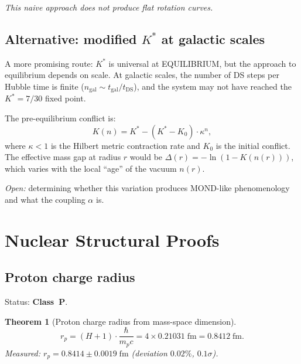 \documentclass[11pt,a4paper]{article}
\newtheorem{theorem}{Theorem}[section]
\theoremstyle{definition}
\theoremstyle{remark}
\begin{document}
\emph{This naive approach does not produce flat rotation curves.}

\subsection{Alternative: modified $K^*$ at galactic scales}\label{sec:modified_K}

A more promising route: $K^*$ is universal at EQUILIBRIUM, but the approach to equilibrium depends on scale. At galactic scales, the number of DS steps per Hubble time is finite ($n_{\mathrm{gal}} \sim t_{\mathrm{gal}}/t_{\mathrm{DS}}$), and the system may not have reached the $K^* = 7/30$ fixed point.

The pre-equilibrium conflict is:
\begin{equation}
K(n) = K^* - (K^* - K_0) \cdot \kappa^n,
\end{equation}
where $\kappa < 1$ is the Hilbert metric contraction rate and $K_0$ is the initial conflict. The effective mass gap at radius $r$ would be $\Delta(r) = -\ln(1 - K(n(r)))$, which varies with the local ``age'' of the vacuum $n(r)$.

\emph{Open:} determining whether this variation produces MOND-like phenomenology and what the coupling $\alpha$ is.


\section{Nuclear Structural Proofs}\label{sec:nuclear}

\subsection{Proton charge radius}\label{sec:proton_radius}

Status: \textbf{Class~P}.

\begin{theorem}[Proton charge radius from mass-space dimension]\label{thm:proton_radius}
\begin{equation}
r_p = (H+1) \cdot \frac{\hbar}{m_p c} = 4 \times 0.21031\;\mathrm{fm} = 0.8412\;\mathrm{fm}.
\end{equation}
Measured: $r_p = 0.8414 \pm 0.0019\;\mathrm{fm}$ (deviation $0.02\%$, $0.1\sigma$).
\end{theorem}
\end{document}
